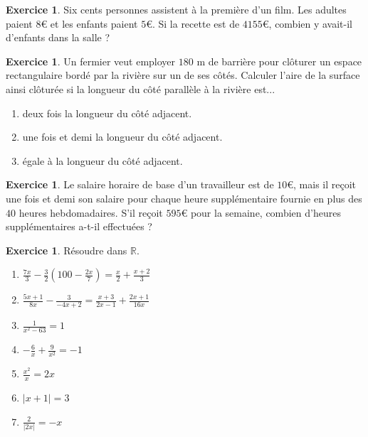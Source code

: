 \documentclass[a4paper,13pt]{scrreprt}
\theoremstyle{plain}
\theoremstyle{definition}
\newtheorem{exo}[subsection]{Exercice}
\newcommand{\rr}{\mathbb{R}}
\begin{document}
\begin{exo} \label{exoei10}
	Six cents personnes assistent à la première d'un film. Les adultes paient $8${\euro} et les enfants paient $5${\euro}. Si la recette est de $4155${\euro}, combien y avait-il d'enfants dans la salle ?
\end{exo}

\begin{exo} \label{exoei11}
	Un fermier veut employer $180$ m de barrière pour clôturer un espace rectangulaire bordé par la rivière sur un de ses côtés. Calculer l'aire de la surface ainsi clôturée si la longueur du côté parallèle à la rivière est...
	\begin{enumerate}
		\item deux fois la longueur du côté adjacent.
		\item une fois et demi la longueur du côté adjacent.
		\item égale à la longueur du côté adjacent.
	\end{enumerate}
\end{exo}

\begin{exo} \label{exoei12}
	Le salaire horaire de base d'un travailleur est de $10${\euro}, mais il reçoit une fois et demi son salaire pour chaque heure supplémentaire fournie en plus des $40$ heures hebdomadaires. S'il reçoit $595${\euro} pour la semaine, combien d'heures supplémentaires a-t-il effectuées ?
\end{exo}

\begin{exo} \label{exoei2}
	Résoudre dans $\rr$.
	\begin{enumerate}
		\item $\frac{7x}{3}-\frac{3}{2}(100-\frac{2x}{7}) = \frac{x}{2} + \frac{x+2}{3}$
		\item $\frac{5x+1}{8x}-\frac{3}{-4x+2}=\frac{x+3}{2x-1} + \frac{2x+1}{16x}$
		\item $\frac{1}{x^2 - 63} = 1$
		\item $-\frac{6}{x}+\frac{9}{x^2}=-1$
		\item $\frac{x^2}{x}=2x$
		\item $|x+1| = 3$
		\item $\frac{2}{|2x|} = -x$
	\end{enumerate}
\end{exo}
\end{document}
